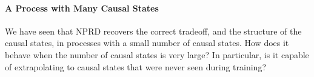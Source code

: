 \documentclass[entropy,article,submit,moreauthors,pdftex,10pt,a4paper]{Definitions/mdpi}
\begin{document}
%
%
%
%
%
%
%
%
%
%
%

\paragraph{A Process with Many Causal States}
We have seen that NPRD recovers the correct tradeoff, and the structure of the causal states, in processes with a small number of causal states.
How does it behave when the number of causal states is very large?
In particular, is it capable of extrapolating to causal states that were never seen during training?
\end{document}
